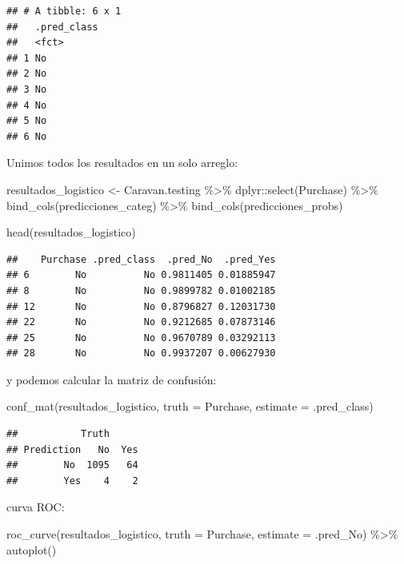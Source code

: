 \documentclass[
  12pt,
]{book}
\newenvironment{Shaded}{\begin{snugshade}}{\end{snugshade}}
\newcommand{\AttributeTok}[1]{\textcolor[rgb]{0.77,0.63,0.00}{#1}}
\newcommand{\FunctionTok}[1]{\textcolor[rgb]{0.00,0.00,0.00}{#1}}
\newcommand{\NormalTok}[1]{#1}
\newcommand{\OtherTok}[1]{\textcolor[rgb]{0.56,0.35,0.01}{#1}}
\newcommand{\SpecialCharTok}[1]{\textcolor[rgb]{0.00,0.00,0.00}{#1}}
\begin{document}
\begin{verbatim}
## # A tibble: 6 x 1
##   .pred_class
##   <fct>      
## 1 No         
## 2 No         
## 3 No         
## 4 No         
## 5 No         
## 6 No
\end{verbatim}

Unimos todos los resultados en un solo arreglo:

\begin{Shaded}
\begin{Highlighting}[]
\NormalTok{resultados\_logistico }\OtherTok{\textless{}{-}}\NormalTok{ Caravan.testing }\SpecialCharTok{\%\textgreater{}\%}
\NormalTok{    dplyr}\SpecialCharTok{::}\FunctionTok{select}\NormalTok{(Purchase) }\SpecialCharTok{\%\textgreater{}\%}
    \FunctionTok{bind\_cols}\NormalTok{(predicciones\_categ) }\SpecialCharTok{\%\textgreater{}\%}
    \FunctionTok{bind\_cols}\NormalTok{(predicciones\_probs)}

\FunctionTok{head}\NormalTok{(resultados\_logistico)}
\end{Highlighting}
\end{Shaded}

\begin{verbatim}
##    Purchase .pred_class  .pred_No  .pred_Yes
## 6        No          No 0.9811405 0.01885947
## 8        No          No 0.9899782 0.01002185
## 12       No          No 0.8796827 0.12031730
## 22       No          No 0.9212685 0.07873146
## 25       No          No 0.9670789 0.03292113
## 28       No          No 0.9937207 0.00627930
\end{verbatim}

y podemos calcular la matriz de confusión:

\begin{Shaded}
\begin{Highlighting}[]
\FunctionTok{conf\_mat}\NormalTok{(resultados\_logistico, }\AttributeTok{truth =}\NormalTok{ Purchase, }\AttributeTok{estimate =}\NormalTok{ .pred\_class)}
\end{Highlighting}
\end{Shaded}

\begin{verbatim}
##           Truth
## Prediction   No  Yes
##        No  1095   64
##        Yes    4    2
\end{verbatim}

curva ROC:

\begin{Shaded}
\begin{Highlighting}[]
\FunctionTok{roc\_curve}\NormalTok{(resultados\_logistico, }\AttributeTok{truth =}\NormalTok{ Purchase, }\AttributeTok{estimate =}\NormalTok{ .pred\_No) }\SpecialCharTok{\%\textgreater{}\%}
    \FunctionTok{autoplot}\NormalTok{()}
\end{Highlighting}
\end{Shaded}
\end{document}
